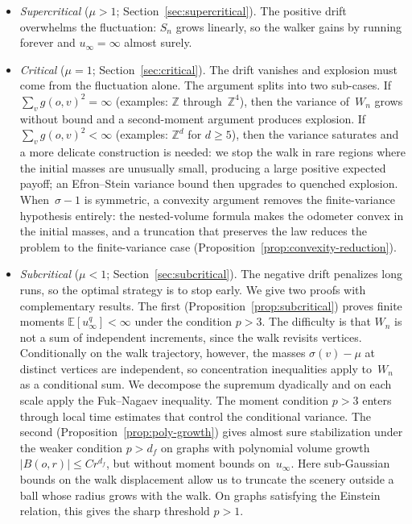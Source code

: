 \documentclass[aop]{imsart}
\theoremstyle{plain}
\theoremstyle{definition}
\newcommand{\Z}{\mathbb{Z}}
\newcommand{\E}{\mathbb{E}}
\begin{document}
	\begin{itemize}
		\item \textit{Supercritical} ($\mu>1$; Section~\ref{sec:supercritical}). The positive drift overwhelms the fluctuation: $S_n$ grows linearly, so the walker gains by running forever and $u_\infty=\infty$ almost surely.
		\item \textit{Critical} ($\mu=1$; Section~\ref{sec:critical}). The drift vanishes and explosion must come from the fluctuation alone. The argument splits into two sub-cases. If $\sum_v g(o,v)^2 = \infty$ (examples: $\Z$ through~$\Z^4$), then the variance of~$W_n$ grows without bound and a second-moment argument produces explosion. If $\sum_v g(o,v)^2<\infty$ (examples: $\Z^d$ for $d\geq 5$), then the variance saturates and a more delicate construction is needed: we stop the walk in rare regions where the initial masses are unusually small, producing a large positive expected payoff; an Efron--Stein variance bound then upgrades to quenched explosion.  When~$\sigma-1$ is symmetric, a convexity argument removes the finite-variance hypothesis entirely: the nested-volume formula makes the odometer convex in the initial masses, and a truncation that preserves the law reduces the problem to the finite-variance case (Proposition~\ref{prop:convexity-reduction}).
		\item \textit{Subcritical} ($\mu<1$; Section~\ref{sec:subcritical}). The negative drift penalizes long runs, so the optimal strategy is to stop early. We give two proofs with complementary results.
		The first (Proposition~\ref{prop:subcritical}) proves finite moments $\E[u_\infty^q]<\infty$ under the condition $p>3$. The difficulty is that $W_n$ is not a sum of independent increments, since the walk revisits vertices. Conditionally on the walk trajectory, however, the masses $\sigma(v)-\mu$ at distinct vertices are independent, so concentration inequalities apply to~$W_n$ as a conditional sum. We decompose the supremum dyadically and on each scale apply the Fuk--Nagaev inequality. The moment condition $p>3$ enters through local time estimates that control the conditional variance.
		The second (Proposition~\ref{prop:poly-growth}) gives almost sure stabilization under the weaker condition $p>d_f$ on graphs with polynomial volume growth $|B(o,r)|\leq Cr^{d_f}$, but without moment bounds on~$u_\infty$. Here sub-Gaussian bounds on the walk displacement allow us to truncate the scenery outside a ball whose radius grows with the walk. On graphs satisfying the Einstein relation, this gives the sharp threshold $p>1$.
	\end{itemize}
\end{document}
